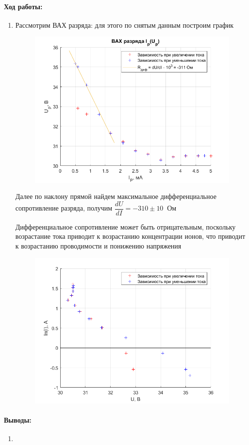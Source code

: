 \documentclass[a4paper,12pt]{article}
\begin{document}
\paragraph{Ход работы:}
\begin{enumerate}
\itemsep0em
\item Рассмотрим ВАХ разряда: для этого по снятым данным построим график
\begin{figure}[h!]
\includegraphics[scale=0.8]{graph_r.png}
\label{razr}
\caption{}
\end{figure}
 
 Далее по наклону прямой найдем максимальное дифференциальное  сопротивление разряда, получим $\dfrac{dU}{dI} = -310 \pm 10 \;\;\text{Ом}$
 
 Дифференциальное сопротивление может быть отрицательным, поскольку возрастание тока приводит к возрастанию концентрации ионов, что приводит к возрастанию
проводимости и понижению напряжения

\begin{figure}[h!]
\includegraphics[scale=0.8]{graph_r_log.png}
\label{razr}
\caption{}
\end{figure}
\end{enumerate}
\paragraph{Выводы:}
\begin{enumerate}
\item
\end{enumerate}
\end{document}
